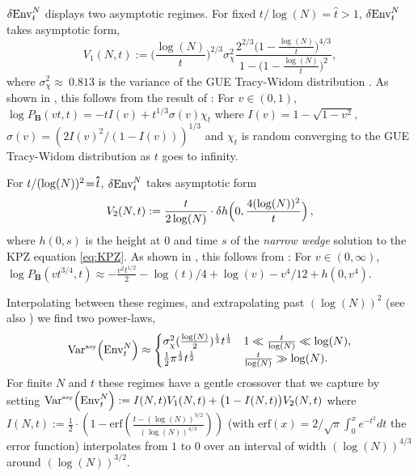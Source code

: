 $\var{\mathrm{Env}^{N}_t}$ displays two asymptotic regimes. For fixed $t/\log(N)=\hat{t}>1$, $\var{\mathrm{Env}^{N}_t}$ takes  asymptotic form,
\begin{equation}\label{eqlogN}
V_1(N, t):=\Big(\frac{\log(N)}{t}\Big)^{2/3} \sigma_{\chi}^2 \frac{2^{2/3}\big(1-\frac{\log(N)}{t}\big)^{4/3}}{1- \big(1- \frac{\log (N)}{t}\big)^2},
\end{equation}
where $\sigma_{\chi}^2\approx~0.813$ is the variance of the GUE Tracy-Widom distribution \cite{prahoferUniversalDistributionsGrowth2000, tracyLevelspacingDistributionsAiry1993}. As shown in \cite{SeeSupplementalMaterial}, this follows from the result of \cite{barraquandRandomwalkBetadistributedRandom2017a}: For $v\in(0,1)$, $\log P_\mathbf{B}(vt,t)=-t I(v) + t^{1/3} \sigma(v)\chi_t$ where $I(v) = 1-\sqrt{1-v^2}$, $\sigma(v) = (2I(v)^2/(1-I(v)))^{1/3}$ and $\chi_t$ is random converging to the GUE Tracy-Widom distribution as $t$ goes to infinity.

For $t/(\log(N))^2\!=\!\hathat{t}$,  $\var{\mathrm{Env}^{N}_t}$ takes asymptotic form
\begin{equation}\label{eqlogNsq}
V_2(N, t):=\frac{t}{2\log(N)} \cdot \var{h\Big(0,\frac{4 (\log(N))^2}{t}\Big)},
\end{equation}
where $h(0,s)$ is the height at $0$ and time $s$ of the {\it narrow wedge} solution to the KPZ equation \eqref{eq:KPZ}. As shown in \cite{SeeSupplementalMaterial}, this follows from \cite{barraquandModerateDeviationsDiffusion2020a}: For $v\in (0,\infty)$,
$
\log P_\mathbf{B}(vt^{3/4},t) \approx -\frac{v^2t^{1/2}}{2} -\log(t)/4+\log(v) - v^4/12 + h(0,v^4).
$

Interpolating between these regimes, and extrapolating past $(\log(N))^2$ (see also \cite{krajenbrinkCrossoverMacroscopicFluctuation2022}) we find two power-laws,
\begin{equation}\label{eq:varqnt}
\mathrm{Var}^{\textrm{\tiny{asy}}}\!\left(\mathrm{Env}^{N}_t\right) \approx
    \begin{cases}
    \sigma_{\chi}^2 (\frac{\log(N)}{2})^{\frac{1}{3}} t^{\frac{1}{3}}& 1 \ll \frac{t}{\log(N)}\ll \log(N),\\
    \frac{1}{2}\pi^{\frac{1}{2}} t^{\frac{1}{2}}& \frac{t}{\log(N)}\gg \log(N).
    \end{cases}
\end{equation}
For finite $N$ and $t$ these regimes have a gentle crossover that we capture by setting
$
\mathrm{Var}^{\textrm{\tiny{asy}}}\!\left(\mathrm{Env}^{N}_t\right) := I(N,t) V_1(N, t)+\big(1-I(N,t)\big) V_2(N, t)
$
where $I(N,t) := \frac{1}{2} \cdot \left(1-\text{erf}\left(\frac{t-(\log(N))^{3/2}}{(\log(N))^{4/3}}\right)\right)$ (with  $\text{erf}(x)= 2/\sqrt{\pi} \int_{0}^{x} e^{-t^2}dt$ the error function) interpolates from $1$ to $0$ over an interval of width $(\log(N))^{4/3}$ around $(\log(N))^{3/2}$.


